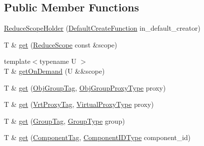 \subsection*{Public Member Functions}
\begin{DoxyCompactItemize}
\item 
\hyperlink{structvt_1_1collective_1_1reduce_1_1detail_1_1_reduce_scope_holder_a08ab58084a54f2cfaa04602120e93b76}{Reduce\+Scope\+Holder} (\hyperlink{structvt_1_1collective_1_1reduce_1_1detail_1_1_reduce_scope_holder_ac1bca1874a023b11bdc3c26b165c3b20}{Default\+Create\+Function} in\+\_\+default\+\_\+creator)
\item 
T \& \hyperlink{structvt_1_1collective_1_1reduce_1_1detail_1_1_reduce_scope_holder_a2cdb8cd71e43cc7a744bdd16d5ed1651}{get} (\hyperlink{structvt_1_1collective_1_1reduce_1_1detail_1_1_reduce_scope}{Reduce\+Scope} const \&scope)
\item 
{\footnotesize template$<$typename U $>$ }\\T \& \hyperlink{structvt_1_1collective_1_1reduce_1_1detail_1_1_reduce_scope_holder_a47aca26691aaff13b240cb2109b189dc}{get\+On\+Demand} (U \&\&scope)
\item 
T \& \hyperlink{structvt_1_1collective_1_1reduce_1_1detail_1_1_reduce_scope_holder_accca4de877182ade06a16d3954590e51}{get} (\hyperlink{structvt_1_1collective_1_1reduce_1_1detail_1_1_reduce_scope_holder_1_1_obj_group_tag}{Obj\+Group\+Tag}, \hyperlink{namespacevt_ad7cae989df485fccca57f0792a880a8e}{Obj\+Group\+Proxy\+Type} proxy)
\item 
T \& \hyperlink{structvt_1_1collective_1_1reduce_1_1detail_1_1_reduce_scope_holder_aa20f0ff351bc6bcccea68e8cd4651969}{get} (\hyperlink{structvt_1_1collective_1_1reduce_1_1detail_1_1_reduce_scope_holder_1_1_vrt_proxy_tag}{Vrt\+Proxy\+Tag}, \hyperlink{namespacevt_a1b417dd5d684f045bb58a0ede70045ac}{Virtual\+Proxy\+Type} proxy)
\item 
T \& \hyperlink{structvt_1_1collective_1_1reduce_1_1detail_1_1_reduce_scope_holder_a666bfa6fa622e3954d6f1a267de48c2e}{get} (\hyperlink{structvt_1_1collective_1_1reduce_1_1detail_1_1_reduce_scope_holder_1_1_group_tag}{Group\+Tag}, \hyperlink{namespacevt_a27b5e4411c9b6140c49100e050e2f743}{Group\+Type} group)
\item 
T \& \hyperlink{structvt_1_1collective_1_1reduce_1_1detail_1_1_reduce_scope_holder_af25ba6525fc0742740c635d9eaa540de}{get} (\hyperlink{structvt_1_1collective_1_1reduce_1_1detail_1_1_reduce_scope_holder_1_1_component_tag}{Component\+Tag}, \hyperlink{namespacevt_ab6ac935c168b809c422d5121da4f2700}{Component\+I\+D\+Type} component\+\_\+id)

\end{DoxyCompactItemize}
